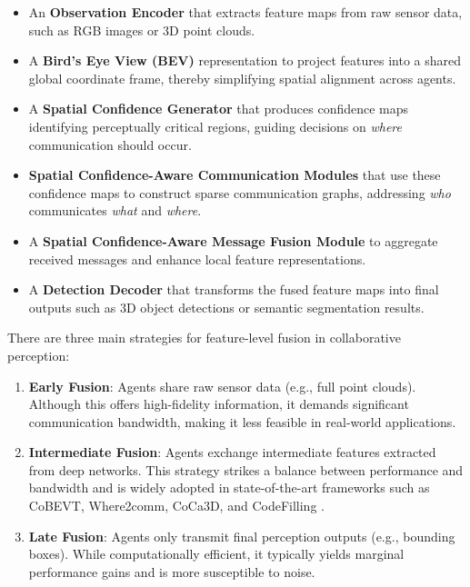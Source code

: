 \begin{itemize}
    \item An \textbf{Observation Encoder} that extracts feature maps from raw sensor data, such as RGB images or 3D point clouds.
    \item A \textbf{Bird’s Eye View (BEV)} representation to project features into a shared global coordinate frame, thereby simplifying spatial alignment across agents.
    \item A \textbf{Spatial Confidence Generator} that produces confidence maps identifying perceptually critical regions, guiding decisions on \textit{where} communication should occur.
    \item \textbf{Spatial Confidence-Aware Communication Modules} that use these confidence maps to construct sparse communication graphs, addressing \textit{who} communicates \textit{what} and \textit{where}.
    \item A \textbf{Spatial Confidence-Aware Message Fusion Module} to aggregate received messages and enhance local feature representations.
    \item A \textbf{Detection Decoder} that transforms the fused feature maps into final outputs such as 3D object detections or semantic segmentation results.
\end{itemize}

There are three main strategies for feature-level fusion in collaborative perception:

\begin{enumerate}
    \item \textbf{Early Fusion}: Agents share raw sensor data (e.g., full point clouds). Although this offers high-fidelity information, it demands significant communication bandwidth, making it less feasible in real-world applications.
    
    \item \textbf{Intermediate Fusion}: Agents exchange intermediate features extracted from deep networks. 
    This strategy strikes a balance between performance and bandwidth and is widely adopted in state-of-the-art frameworks such as CoBEVT, Where2comm, CoCa3D, and CodeFilling \cite{xu2022cobevtcooperativebirdseye, hu2022where2commcommunicationefficientcollaborativeperception, hu2023collaborationhelpscameraovertake, hu2024communicationefficientcollaborativeperceptioninformation}.

    \item \textbf{Late Fusion}: Agents only transmit final perception outputs (e.g., bounding boxes). While computationally efficient, it typically yields marginal performance gains and is more susceptible to noise.
\end{enumerate}

